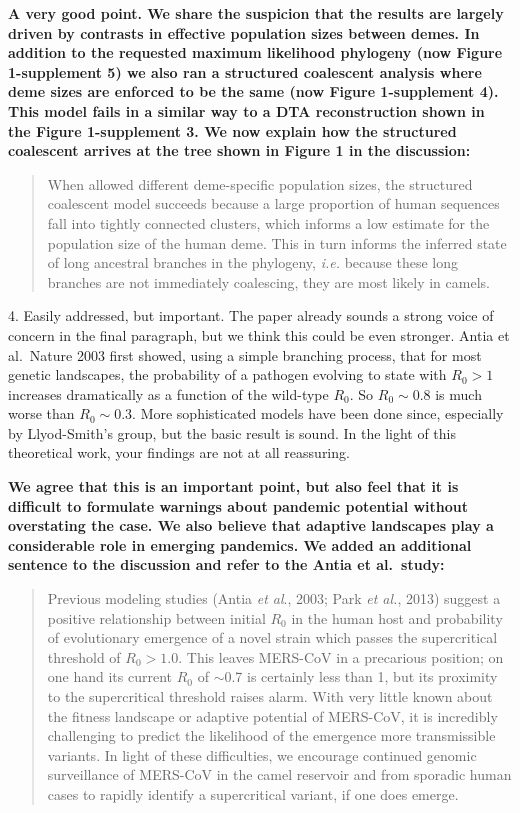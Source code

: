 \documentclass[11pt,oneside,letterpaper]{article}
\begin{document}
\textbf{A very good point. We share the suspicion that the results are largely driven by contrasts in effective population sizes between demes. In addition to the requested maximum likelihood phylogeny (now Figure 1-supplement 5) we also ran a structured coalescent analysis where deme sizes are enforced to be the same (now Figure 1-supplement 4). This model fails in a similar way to a DTA reconstruction shown in the Figure 1-supplement 3. We now explain how the structured coalescent arrives at the tree shown in Figure 1 in the discussion:}

\begin{quotation}
When allowed different deme-specific population sizes, the structured coalescent model succeeds because a large proportion of human sequences fall into tightly connected clusters, which informs a low estimate for the population size of the human deme.
This in turn informs the inferred state of long ancestral branches in the phylogeny, \textit{i.e.} because these long branches are not immediately coalescing, they are most likely in camels.
\end{quotation}

4. Easily addressed, but important. The paper already sounds a strong voice of concern in the final paragraph, but we think this could be even stronger. Antia et al.\ Nature 2003 first showed, using a simple branching process, that for most genetic landscapes, the probability of a pathogen evolving to state with $R_0>1$ increases dramatically as a function of the wild-type $R_0$. So $R_0\sim0.8$ is much worse than $R_0\sim0.3$. More sophisticated models have been done since, especially by Llyod-Smith's group, but the basic result is sound. In the light of this theoretical work, your findings are not at all reassuring.

\textbf{We agree that this is an important point, but also feel that it is difficult to formulate warnings about pandemic potential without overstating the case. We also believe that adaptive landscapes play a considerable role in emerging pandemics. We added an additional sentence to the discussion and refer to the Antia et al.\ study:}

\begin{quotation}
Previous modeling studies (Antia \textit{et al}., 2003; Park \textit{et al.}, 2013) suggest a positive relationship between initial $R_{0}$ in the human host and probability of evolutionary emergence of a novel strain which passes the supercritical threshold of $R_{0}>1.0$.
This leaves MERS-CoV in a precarious position; on one hand its current $R_{0}$ of $\sim$0.7 is certainly less than 1, but its proximity to the supercritical threshold raises alarm.
With very little known about the fitness landscape or adaptive potential of MERS-CoV, it is incredibly challenging to predict the likelihood of the emergence more transmissible variants.
In light of these difficulties, we encourage continued genomic surveillance of MERS-CoV in the camel reservoir and from sporadic human cases to rapidly identify a supercritical variant, if one does emerge.
\end{quotation}
\end{document}
